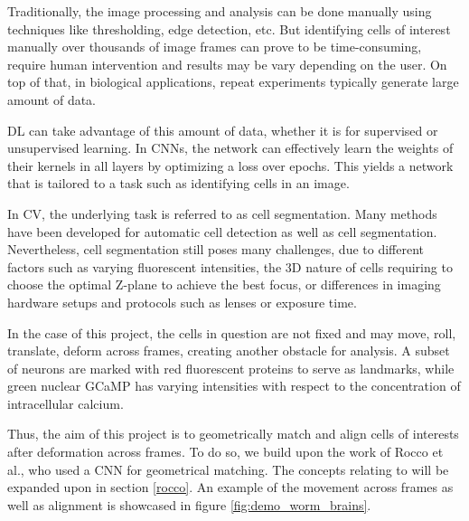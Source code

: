 \documentclass[10pt,conference,compsocconf]{IEEEtran}
\begin{document}
Traditionally, the image processing and analysis can be done manually using techniques like thresholding, edge detection, etc. But identifying cells of interest manually over thousands of image frames can prove to be time-consuming, require human intervention and results may be vary depending on the user. On top of that, in biological applications, repeat experiments typically generate large amount of data.

DL can take advantage of this amount of data, whether it is for supervised or unsupervised learning. In CNNs, the network can effectively learn the weights of their kernels in all layers by optimizing a loss over epochs. This yields a network that is tailored to a task such as identifying cells in an image.

In CV, the underlying task is referred to as cell segmentation. Many methods have been developed for automatic cell detection\cite{jiang_geometry-aware_2020,xie_efficient_2018} as well as cell segmentation\cite{dimopoulos_accurate_2014,loewke_automated_2018}. Nevertheless, cell segmentation still poses many challenges\cite{peng_bioimage_2008}, due to different factors such as varying fluorescent intensities, the 3D nature of cells requiring to choose the optimal Z-plane to achieve the best focus, or differences in imaging hardware setups and protocols such as lenses or exposure time.

In the case of this project, the cells in question are not fixed and may move, roll, translate, deform across frames, creating another obstacle for analysis. A subset of neurons are marked with red fluorescent proteins to serve as landmarks, while green nuclear GCaMP has varying intensities with respect to the concentration of intracellular calcium. 

Thus, the aim of this project is to geometrically match and align cells of interests after deformation across frames. To do so, we build upon the work of Rocco et al.\cite{roccoConvolutionalNeuralNetwork2017}, who used a CNN for geometrical matching. The concepts relating to \cite{roccoConvolutionalNeuralNetwork2017} will be expanded upon in section \ref{rocco}. An example of the movement across frames as well as alignment is showcased in figure \ref{fig:demo_worm_brains}.
\end{document}
